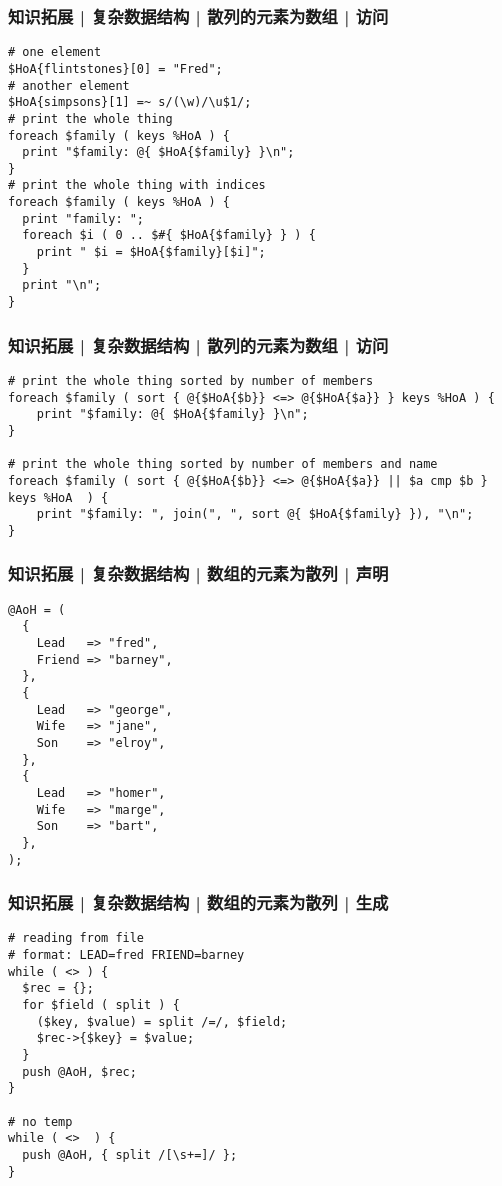 \begin{frame}[fragile]
  \frametitle{知识拓展 | 复杂数据结构 | 散列的元素为数组 | 访问}
  \vspace{-0.8em}
\begin{lstlisting}
# one element
$HoA{flintstones}[0] = "Fred";
# another element
$HoA{simpsons}[1] =~ s/(\w)/\u$1/;
# print the whole thing
foreach $family ( keys %HoA ) {
  print "$family: @{ $HoA{$family} }\n";
}
# print the whole thing with indices
foreach $family ( keys %HoA ) {
  print "family: ";
  foreach $i ( 0 .. $#{ $HoA{$family} } ) {
    print " $i = $HoA{$family}[$i]";
  }
  print "\n";
}
\end{lstlisting}
\end{frame}

\begin{frame}[fragile]
  \frametitle{知识拓展 | 复杂数据结构 | 散列的元素为数组 | 访问}
\begin{lstlisting}
# print the whole thing sorted by number of members
foreach $family ( sort { @{$HoA{$b}} <=> @{$HoA{$a}} } keys %HoA ) {
    print "$family: @{ $HoA{$family} }\n";
}

# print the whole thing sorted by number of members and name
foreach $family ( sort { @{$HoA{$b}} <=> @{$HoA{$a}} || $a cmp $b } keys %HoA  ) {
    print "$family: ", join(", ", sort @{ $HoA{$family} }), "\n";
}
\end{lstlisting}
\end{frame}

\begin{frame}[fragile]
  \frametitle{知识拓展 | 复杂数据结构 | 数组的元素为散列 | 声明}
  \vspace{-0.8em}
\begin{lstlisting}
@AoH = (
  {
    Lead   => "fred",
    Friend => "barney",
  },
  {
    Lead   => "george",
    Wife   => "jane",
    Son    => "elroy",
  },
  {
    Lead   => "homer",
    Wife   => "marge",
    Son    => "bart",
  },
);
\end{lstlisting}
\end{frame}

\begin{frame}[fragile]
  \frametitle{知识拓展 | 复杂数据结构 | 数组的元素为散列 | 生成}
\begin{lstlisting}
# reading from file
# format: LEAD=fred FRIEND=barney
while ( <> ) {
  $rec = {};
  for $field ( split ) {
    ($key, $value) = split /=/, $field;
    $rec->{$key} = $value;
  }
  push @AoH, $rec;
}

# no temp
while ( <>  ) {
  push @AoH, { split /[\s+=]/ };
}
\end{lstlisting}
\end{frame}

